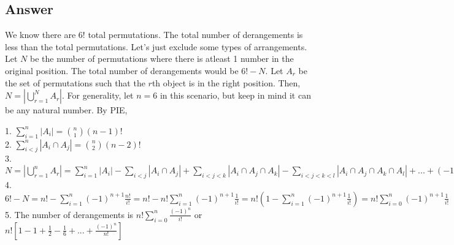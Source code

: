 \documentclass{article}
\begin{document}
\subsection{Answer}
We know there are $6!$ total permutations. The total
number of derangements is less than the total permutations.
Let's just exclude some types of arrangements. Let $N$ be
the number of permutations where there is atleast 1 number
in the original position. The total number of derangements
would be $6! - N$. Let $A_r$ be the set of permutations
such that the $r$th object is in the right position. Then,
$N = |\bigcup\limits_{r=1}^{N}A_r|$. For generality, let $n=6$ in
this scenario, but keep in mind it can be any natural number. By PIE,\\
\begin{center}
    \begin{large}
        1. $\sum\limits_{i=1}^{n}{|A_i|} = \binom{n}{1}(n-1)!$\\
        2.  $\sum\limits_{i<j}^{n}{|A_i \cap A_j|} = \binom{n}{2}(n-2)!$\\
        3. $N = |\bigcup\limits_{r=1}^{n}A_r|
            = \sum\limits_{i=1}^{n}{|A_i|}
            - \sum\limits_{i<j}{|A_i \cap A_j|}
            + \sum\limits_{i<j<k}{|A_i \cap A_j \cap A_k|}
            - \sum\limits_{i<j<k<l}
            {|A_i\cap{A_j}\cap{A_k}\cap{A_l}|} + ...
            + (-1)^{n+1}|A_1 \cap A_2 \cap ... \cap A_n|
            = \sum\limits_{i=1}^{n}{\binom{n}{i}(-1)^{n+1}
            (n-i)!}=\sum\limits_{i=1}^{n}{(-1)^{n+1}\frac{n!}{i!}}$\\
        4. $6! - N = n! - \sum\limits_{i=1}^{n}{(-1)^{n+1}\frac{n!}{i!}}
            = n! - n!\sum\limits_{i=1}^{n}{(-1)^{n+1}\frac{1}{i!}}
            = n!(1-\sum\limits_{i=1}^{n}{(-1)^{n+1}\frac{1}{i!}})
            = n!\sum\limits_{i=0}^{n}{(-1)^{n+1}\frac{1}{i!}}$\\
        5. The number of derangements is
        $\boxed{n!\sum\limits_{i=0}^{n}{\frac{(-1)^{n}}{i!}}}$ or
        $\boxed{n![1-1+\frac{1}{2}-\frac{1}{6}+...+\frac{(-1)^n}{n!}]}$
    \end{large}
\end{center}
\end{document}
